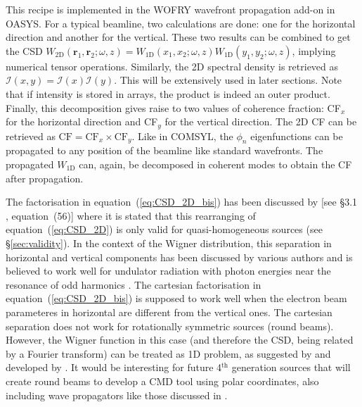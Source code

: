 \documentclass{iucr}              %
\begin{document}
This recipe is implemented in the WOFRY wavefront propagation add-on in OASYS. For a typical beamline, two calculations are done: one for the horizontal direction and another for the vertical. These two results can be combined to get the CSD $W_\text{2D}(\textbf{r}_1,\textbf{r}_2;\omega,z)=W_\text{1D}(x_1,x_2;\omega,z) W_\text{1D}(y_1,y_2;\omega,z)$, implying numerical tensor operations. Similarly, the 2D spectral density is retrieved as $\mathcal{I}(x,y)=\mathcal{I}(x) \mathcal{I}(y)$. This will be extensively used in later sections. Note that if intensity is stored in arrays, the product is indeed an outer product. Finally, this decomposition gives raise to two values of coherence fraction: CF$_x$ for the horizontal direction and CF$_y$ for the vertical direction. The 2D CF can be retrieved as $\text{CF}=\text{CF}_{x} \times \text{CF}_{y}$. Like in COMSYL, the $\phi_n$ eigenfunctions can be propagated to any position of the beamline like standard wavefronts.
The propagated $W_\text{1D}$ can, again, be decomposed in coherent modes to obtain the CF after propagation. 

The factorisation in equation~(\ref{eq:CSD_2D_bis}) has been discussed by  [see §3.1 , equation~(56)] where it is stated that this rearranging of equation~(\ref{eq:CSD_2D}) is only valid for quasi-homogeneous sources (see \S\ref{sec:validity}). In the context of the Wigner distribution, this separation in horizontal and vertical components has been discussed by various authors and is believed to work well for undulator radiation with photon energies near the resonance of odd
harmonics \cite{Bazarov2012,tanaka2014,nash2021}. 
The cartesian factorisation in equation~(\ref{eq:CSD_2D_bis}) is supposed to work well when the electron beam parameteres in horizontal are different from the vertical ones. The cartesian separation does not work for rotationally symmetric sources (round beams). However, the Wigner function in this case (and therefore the CSD, being related by a Fourier transform) can be treated as 1D problem, as suggested by  and developed by . It would be interesting for future 4$^\text{th}$ generation sources that will create round beams to develop a CMD tool using polar coordinates, also including wave propagators like those discussed in \cite{LiJacobsen}. 
\end{document}
